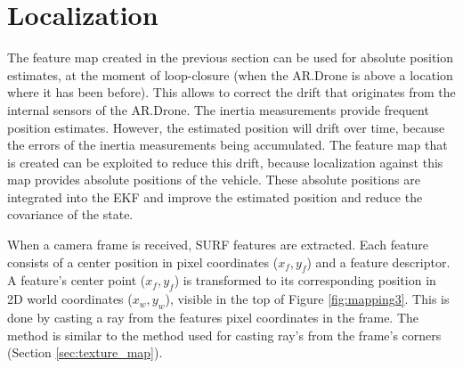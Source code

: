 	\section{Localization}

The feature map created in the previous section can be used for absolute position estimates, at the moment of loop-closure (when the AR.Drone is above a location where it has been before).
This allows to correct the drift that originates from the internal sensors of the AR.Drone.
The inertia measurements provide frequent position estimates.
However, the estimated position will drift over time, because the errors of the inertia measurements being accumulated.
The feature map that is created can be exploited to reduce this drift, because localization against this map provides absolute positions of the vehicle.
These absolute positions are integrated into the EKF and improve the estimated position and reduce the covariance of the state.

When a camera frame is received, SURF features are extracted.
Each feature consists of a center position in pixel coordinates ($x_f, y_f$) and a feature descriptor.
A feature's center point ($x_f, y_f$) is transformed to its corresponding position in 2D world coordinates ($x_w, y_w$), visible in the top of Figure \ref{fig:mapping3}.
This is done by casting a ray from the features pixel coordinates in the frame.
The method is similar to the method used for casting ray's from the frame's corners (Section \ref{sec:texture_map}).

